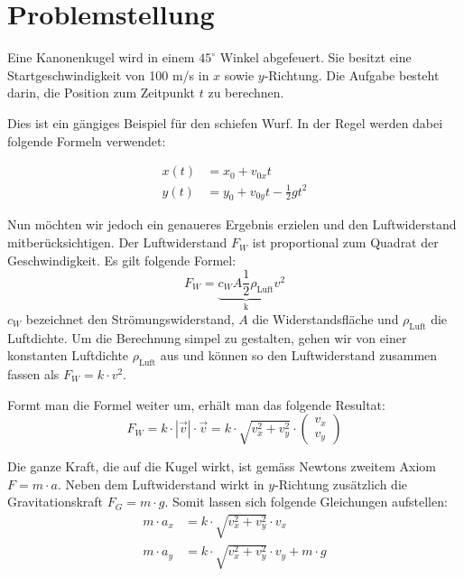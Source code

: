 \section{Problemstellung
\label{perturbation:section:problemstellung}}
Eine Kanonenkugel wird in einem $45^{\circ}$ Winkel abgefeuert.
Sie besitzt eine Startgeschwindigkeit von 100 m/s in $x$ sowie $y$-Richtung.
Die Aufgabe besteht darin, die Position zum Zeitpunkt $t$ zu berechnen.

Dies ist ein gängiges Beispiel für den schiefen Wurf.
In der Regel werden dabei folgende Formeln verwendet:

\begin{equation}\label{eq:x_simple}
\begin{aligned}
    x(t) &= x_0 + v_{0x}t\\
    y(t) &= y_0 + v_{0y}t - \frac{1}{2}gt^2
\end{aligned}
\end{equation}


Nun möchten wir jedoch ein genaueres Ergebnis erzielen und den Luftwiderstand mitberücksichtigen.
Der Luftwiderstand $F_W$ ist proportional zum Quadrat der Geschwindigkeit.
Es gilt folgende Formel:
\[
F_W = \underbrace{c_WA\frac{1}{2}\rho_{\text{Luft}}}_\text{k}v^2
\]
$c_W$ bezeichnet den Strömungswiderstand, $A$ die Widerstandsfläche und $\rho_{\text{Luft}}$ die Luftdichte.
Um die Berechnung simpel zu gestalten, gehen wir von einer konstanten Luftdichte $\rho_{\text{Luft}}$ aus und können so den Luftwiderstand zusammen fassen als $F_W = k \cdot v^2$.

Formt man die Formel weiter um, erhält man das folgende Resultat:
\[
F_W = k \cdot |\vec{v}| \cdot \vec{v} = k \cdot \sqrt{v_x^2 + v_y^2} \cdot \begin{pmatrix}v_x\\v_y\end{pmatrix}
\]

Die ganze Kraft, die auf die Kugel wirkt, ist gemäss Newtons zweitem Axiom $F = m \cdot a$.
Neben dem Luftwiderstand wirkt in $y$-Richtung zusätzlich die Gravitationskraft $F_G = m \cdot g$.
Somit lassen sich folgende Gleichungen aufstellen:
\begin{align*}
m \cdot a_x &= k \cdot \sqrt{v_x^2 + v_y^2} \cdot v_x\\
m \cdot a_y &= k \cdot \sqrt{v_x^2 + v_y^2} \cdot v_y + m \cdot g
\end{align*}

